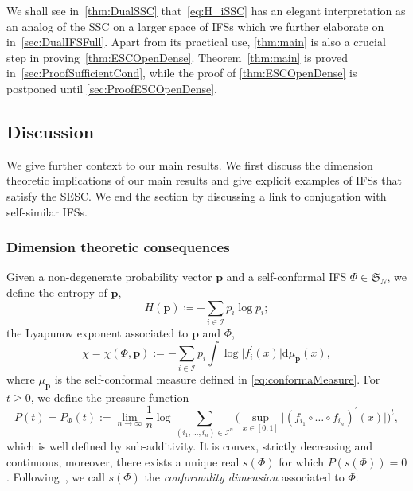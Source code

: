 \documentclass[12pt,]{article}
\def\cref#1{\ref{#1}}%
\theoremstyle{definition}
\theoremstyle{remark}
\newcommand{\0}{\mathbf{0}}
\begin{document}
{We shall see in~\cref{thm:DualSSC} that~\cref{eq:H_iSSC} has an elegant interpretation as an analog
of the SSC on a larger space of IFSs which we further elaborate on in~\cref{sec:DualIFSFull}. Apart
from its practical use, \cref{thm:main} is also a crucial step in proving~\cref{thm:ESCOpenDense}.
Theorem~\ref{thm:main} is proved in~\cref{sec:ProofSufficientCond}, while the proof of
\cref{thm:ESCOpenDense} is postponed until \cref{sec:ProofESCOpenDense}.

\subsection{Discussion}
We give further context to our main results. We first discuss the dimension theoretic implications
of our main results and  give explicit examples of IFSs that satisfy the SESC. We end the section by
discussing a link to conjugation with self-similar IFSs.

\subsubsection{Dimension theoretic consequences}
Given a non-degenerate probability vector $\mathbf{p}$ and a self-conformal IFS $\Phi\in
\mathfrak{S}_N$, we define the entropy of $\mathbf{p}$,
\begin{equation*}
H(\mathbf{p})\coloneqq -\sum_{i\in\mathcal{I}} p_i\log p_i;
\end{equation*}
the Lyapunov exponent associated to $\mathbf{p}$ and $\Phi$,
\begin{equation*}
\chi=\chi(\Phi,\mathbf{p}):=-\sum_{i \in \mathcal{I}} p_i \int \log \big|f_{i}^{'}(x)\big|
\mathrm{d} \mu_{\mathbf{p}}(x),
\end{equation*}
where $\mu_{\mathbf{p}}$ is the self-conformal measure defined in \cref{eq:conformaMeasure}.
For $t\geq 0$, we define the pressure function
\begin{equation*}
P(t)=P_{\Phi}(t):=\lim _{n \rightarrow \infty} \frac{1}{n} \log \sum_{(i_1,\ldots,i_n) \in
\mathcal{I}^n} \Big(\sup_{x\in[0,1]} \big|(f_{i_1}\circ \dots \circ
f_{i_n})^{\prime}(x)\big|\Big)^t,
\end{equation*}
which is well defined by sub-additivity. It is convex, strictly decreasing and continuous, moreover,
there exists a unique real $s(\Phi)$ for which $P(s(\Phi))=0$.
Following~\cite[Chapter~14]{BaranySimonSolomyak_Book23}, we call $s(\Phi)$ the \emph{conformality
dimension} associated to $\Phi$. 

}
\end{document}
